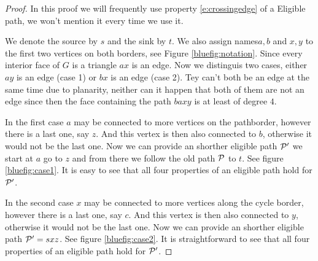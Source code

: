 \documentclass[a4paper]{article}
\theoremstyle{definition}
\newcommand{\scr}[1]{\mathcal{#1}}
\newcommand{\C}{\scr C}
\begin{document}
\begin{proof}
In this proof we will frequently use property \ref{e:crossingedge} of a Eligible path, we won't mention it every time we use it.

We denote the source by $s$ and the sink by $t$. We also assign names$a, b$ and $x, y$ to the first two vertices on both borders, see Figure \ref{bluefig:notation}. Since every interior face of $G$ is a triangle $ax$ is an edge. Now we distinguis two cases, either $ay$ is an edge (case 1) or $bx$ is an edge (case 2). Tey can't both be an edge at the same time due to planarity, neither can it happen that both of them are not an edge since then the face containing the path $baxy$ is at least of degree $4$.

In the first case $a$ may be connected to more vertices on the pathborder, however there is a last one, say $z$. And this vertex is then also connected to $b$, otherwise it would not be the last one. Now we can provide an shorther eligible path $\P'$ we start at $a$ go to $z$ and from there we follow the old path $\P$ to $t$.  See figure \ref{bluefig:case1}. It is easy to see that all four properties of an eligible path hold for $\P'$.

In the second case $x$ may be connected to more vertices along the cycle border, however there is a last one, say $c$. And this vertex is then also connected to $y$, otherwise it would not be the last one. Now we can provide an shorther eligible path $\P' = sxz$.   See figure \ref{bluefig:case2}. It is straightforward to see that all four properties of an eligible path hold for $\P'$. %
\end{proof}
\end{document}
